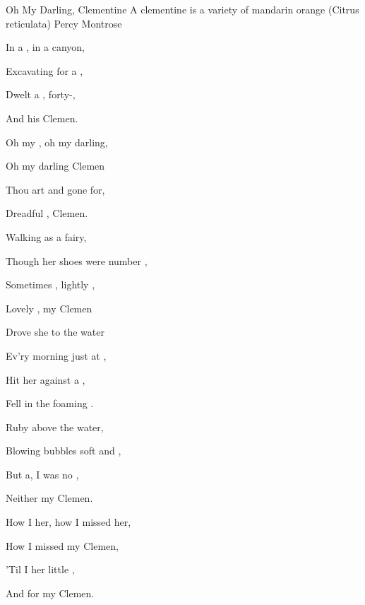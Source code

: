 \begin{SBSong}{Oh My Darling, Clementine}
  {A clementine is a variety of mandarin orange (Citrus reticulata)}
  {Percy Montrose}
  \begin{SBVerse}
    In a , in a canyon, 
    
    Excavating for a , 
    
    Dwelt a , forty-,
 
    And his  Clemen.
  \end{SBVerse}
  \begin{SBChorus}
    Oh my , oh my darling, 
    
    Oh my darling Clemen 
    
    Thou art  and gone for, 
    
    Dreadful , Clemen.
  \end{SBChorus}
  \begin{SBVerse}
    Walking  as a fairy, 
    
    Though her shoes were number , 
    
    Sometimes , lightly , 
    
    Lovely , my Clemen
  \end{SBVerse}
  \begin{SBVerse}
    Drove she  to the water 
    
    Ev'ry morning just at , 
    
    Hit her  against a ,
 
    Fell in the foaming .
  \end{SBVerse}
  \begin{SBVerse}
    Ruby  above the water, 
    
    Blowing bubbles soft and , 
    
    But a, I was no ,
 
    Neither  my Clemen.
  \end{SBVerse}
  \begin{SBVerse}
    How I  her, how I missed her, 
    
    How I missed my Clemen, 
    
    'Til I  her little , 
    
    And for my Clemen.
  \end{SBVerse}
\end{SBSong}